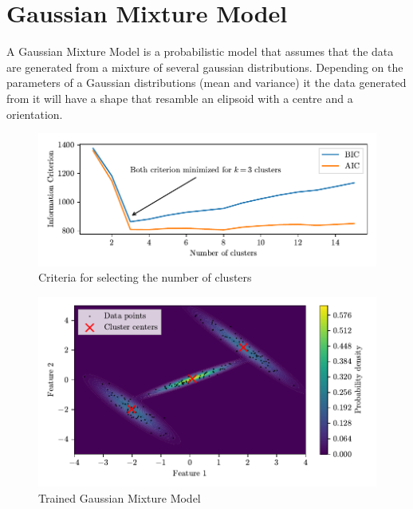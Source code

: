 \section{Gaussian Mixture Model}
\label{sec:gaussian}
A Gaussian Mixture Model is a probabilistic model that assumes that the data are generated from a mixture of several gaussian distributions. Depending on the parameters of a Gaussian distributions (mean and variance) it the data generated from it will have a shape that resamble an elipsoid with a centre and a orientation.
 

\begin{figure}[htbp]
    \centering
    \includegraphics{images/Gaussian/Figure_1.pdf}
    \caption{Criteria for selecting the number of clusters}
    \label{fig:gauss_criterion}
\end{figure}

\begin{figure}[htbp]
    \centering
    \includegraphics{images/Gaussian/Figure_2.pdf}
    \caption{Trained Gaussian Mixture Model}
    \label{fig:gauss_example}
\end{figure}
